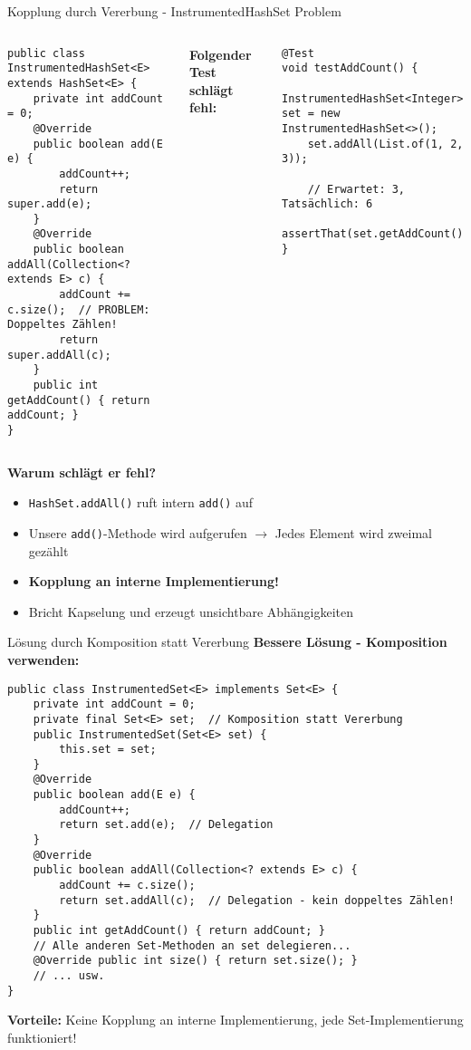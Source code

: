 \begin{frame}[fragile]{Kopplung durch Vererbung - InstrumentedHashSet Problem}
  \begin{columns}[T]
    \begin{lstlisting}[style=java, basicstyle=\tiny\ttfamily]
public class InstrumentedHashSet<E> extends HashSet<E> {
    private int addCount = 0;
    @Override
    public boolean add(E e) {
        addCount++;
        return super.add(e);
    }
    @Override
    public boolean addAll(Collection<? extends E> c) {
        addCount += c.size();  // PROBLEM: Doppeltes Zählen!
        return super.addAll(c);
    }
    public int getAddCount() { return addCount; }
}
    \end{lstlisting}
    \textbf{Folgender Test schlägt fehl:}
    \begin{lstlisting}[style=java, basicstyle=\tiny\ttfamily]
@Test
void testAddCount() {
    InstrumentedHashSet<Integer> set = new InstrumentedHashSet<>();
    set.addAll(List.of(1, 2, 3));

    // Erwartet: 3, Tatsächlich: 6
    assertThat(set.getAddCount()).isEqualTo(3);
}
    \end{lstlisting}
  \end{columns}

  \textbf{Warum schlägt er fehl?}
  \begin{itemize}
    \item \texttt{HashSet.addAll()} ruft intern \texttt{add()} auf
    \item Unsere \texttt{add()}-Methode wird aufgerufen $\rightarrow$ Jedes Element wird zweimal gezählt
    \item \textbf{Kopplung an interne Implementierung!}
    \item Bricht Kapselung und erzeugt unsichtbare Abhängigkeiten
  \end{itemize}
\end{frame}

\begin{frame}[fragile]{Lösung durch Komposition statt Vererbung}
  \textbf{Bessere Lösung - Komposition verwenden:}
  \begin{lstlisting}[style=java, basicstyle=\tiny\ttfamily]
public class InstrumentedSet<E> implements Set<E> {
    private int addCount = 0;
    private final Set<E> set;  // Komposition statt Vererbung
    public InstrumentedSet(Set<E> set) {
        this.set = set;
    }
    @Override
    public boolean add(E e) {
        addCount++;
        return set.add(e);  // Delegation
    }
    @Override
    public boolean addAll(Collection<? extends E> c) {
        addCount += c.size();
        return set.addAll(c);  // Delegation - kein doppeltes Zählen!
    }
    public int getAddCount() { return addCount; }
    // Alle anderen Set-Methoden an set delegieren...
    @Override public int size() { return set.size(); }
    // ... usw.
}
  \end{lstlisting}
  \textbf{Vorteile:} Keine Kopplung an interne Implementierung, jede Set-Implementierung funktioniert!
\end{frame}


